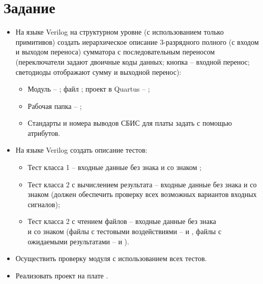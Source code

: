 





\tableofcontents
\newpage
\lstlistoflistings
\listoffigures
\newpage

\section{Задание}

\begin{itemize}
	\item На языке Verilog на структурном уровне (с использованием только примитивов) создать иерархическое описание $3$-разрядного полного (с входом и выходом переноса) сумматора с последовательным переносом (переключатели задают двоичные коды данных; кнопка -- входной перенос; светодиоды отображают сумму и выходной перенос):
		\begin{itemize}
			\item Модуль -- ; файл ; проект в Quartus -- ;
			\item Рабочая папка -- ;
			\item Стандарты и номера выводов СБИС для платы  задать с помощью атрибутов.
		\end{itemize}
	
	\item На языке Verilog создать описание тестов:
		\begin{itemize}
			\item Тест класса 1 -- входные данные без знака  и со знаком ;
			\item Тест класса 2 с вычислением результата -- входные данные без знака  и со знаком  (должен обеспечить проверку всех возможных вариантов входных сигналов);
			\item Тест класса 2 с чтением файлов -- входные данные без знака\\  и со знаком  (файлы с тестовыми воздействиями --  и , файлы с ожидаемыми результатами --  и ).
		\end{itemize}
	
	\item Осуществить проверку модуля с использованием всех тестов.
	
	\item Реализовать проект на плате .
\end{itemize}

